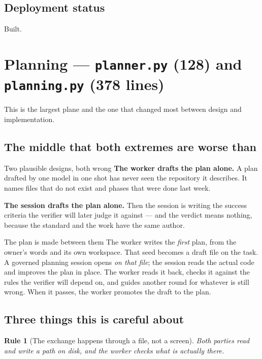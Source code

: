 \documentclass[11pt]{article}
\newtheorem{drule}{Rule}
\newcommand{\code}[1]{\texttt{\small #1}}
\begin{document}
\subsection{Deployment status}

Built.

\section{Planning --- \code{planner.py} (128) and \code{planning.py} (378 lines)}
\label{sec:planning}

This is the largest plane and the one that changed most between design and implementation.

\subsection{The middle that both extremes are worse than}

\begin{cautionbox}{Two plausible designs, both wrong}
\textbf{The worker drafts the plan alone.} A plan drafted by one model in one shot has never seen the repository it describes. It names files that do not exist and phases that were done last week.

\textbf{The session drafts the plan alone.} Then the session is writing the success criteria the verifier will later judge it against --- and the verdict means nothing, because the standard and the work have the same author.
\end{cautionbox}

\begin{claimbox}{The plan is made between them}
The worker writes the \emph{first} plan, from the owner's words and its own workspace. That seed becomes a draft file on the task. A governed planning session opens \emph{on that file}; the session reads the actual code and improves the plan in place. The worker reads it back, checks it against the rules the verifier will depend on, and guides another round for whatever is still wrong. When it passes, the worker promotes the draft to the plan.
\end{claimbox}

\subsection{Three things this is careful about}

\begin{drule}[The exchange happens through a file, not a screen]
\label{rule:file}
Both parties read and write a path on disk, and the worker checks what is actually there.
\end{drule}
\end{document}
